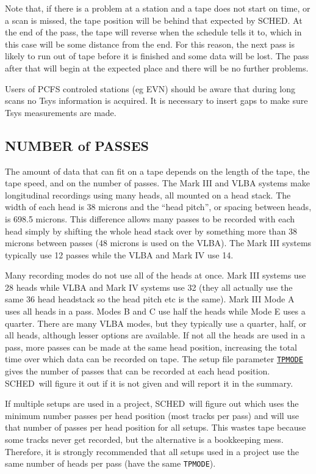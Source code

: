 \documentclass{report}
\newcommand{\sched}{{\sc SCHED}}
\newcommand{\schedb}{{\sc SCHED~}}
\begin{document}
Note that, if there is a problem at a station and a tape does not
start on time, or a scan is missed, the tape position will be behind
that expected by \sched.  At the end of the pass, the tape will reverse
when the schedule tells it to, which in this case will be some distance
from the end.  For this reason, the next pass is likely to run out of
tape before it is finished and some data will be lost.  The pass after
that will begin at the expected place and there will be no further
problems.

Users of PCFS controled stations (eg EVN) should be aware that during
long scans no Tsys information is acquired. It is necessary to insert
gaps to make sure Tsys measurements are made.

\subsection{\label{SSSEC:NUMPASSES}NUMBER of PASSES}

The amount of data that can fit on a tape depends on the length
of the tape, the tape speed, and on the number of passes.  The
Mark III and VLBA systems make longitudinal recordings using many
heads, all mounted on a head stack.  The width of each head is 38
microns and the ``head pitch'', or spacing between heads, is
698.5 microns.  This difference allows many passes to be recorded
with each head simply by shifting the whole head stack over by
something more than 38 microns between passes (48 microns is used
on the VLBA).  The Mark III systems typically use 12 passes while
the VLBA and Mark IV use 14.

Many recording modes do not use all of the heads at once.  Mark III
systems use 28 heads while VLBA and Mark IV systems use 32 (they all
actually use the same 36 head headstack so the head pitch etc is the
same).  Mark III Mode A uses all heads in a pass.  Modes B and C use
half the heads while Mode E uses a quarter.  There are many VLBA
modes, but they typically use a quarter, half, or all heads, although
lesser options are available.  If not all the heads are used in a
pass, more passes can be made at the same head position, increasing
the total time over which data can be recorded on tape.  The setup
file parameter 
{\hyperref[SP:TPMODE]{{\tt TPMODE}}} gives the number of
passes that can be recorded at each head position.  \schedb will
figure it out if it is not given and will report it in the summary.

If multiple setups are used in a project, \schedb will figure out
which uses the minimum number passes per head position (most
tracks per pass) and will use that number of passes per head position
for all setups.  This wastes tape because some tracks never get
recorded, but the alternative is a bookkeeping mess.  Therefore,
it is strongly recommended that all setups used in a project use
the same number of heads per pass (have the same {\tt TPMODE}).
\end{document}
